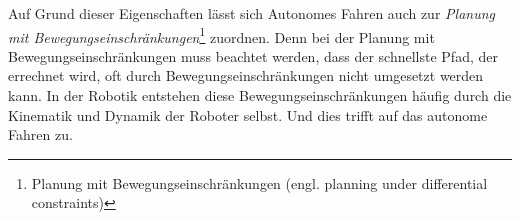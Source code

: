 Auf Grund dieser Eigenschaften lässt sich Autonomes Fahren auch zur \textit{Planung mit Bewegungseinschränkungen}\footnote{Planung mit Bewegungseinschränkungen (engl. planning under differential constraints)} zuordnen. Denn bei der Planung mit Bewegungseinschränkungen  muss beachtet werden, dass der schnellste Pfad, der errechnet wird, oft durch Bewegungseinschränkungen nicht umgesetzt werden kann. In der Robotik entstehen diese Bewegungseinschränkungen häufig durch die Kinematik und Dynamik der Roboter selbst. Und dies trifft auf das autonome Fahren zu.\\
